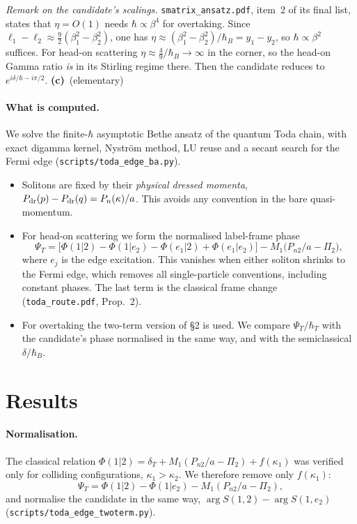 \documentclass[11pt,a4paper]{article}
\newcommand{\Lc}{\textsf{\textbf{(c)}}}\newcommand{\Ld}{\textsf{\textbf{(d)}}}
\newcommand{\script}[1]{\texttt{scripts/#1}}
\begin{document}
\emph{Remark on the candidate's scalings.} \texttt{smatrix\_ansatz.pdf}, item~2 of its final list, states that $\eta=O(1)$ needs $\hbar\propto\beta^4$ for overtaking. Since $\ell_1-\ell_2\approx\tfrac92(\beta_1^2-\beta_2^2)$, one has $\eta\approx(\beta_1^2-\beta_2^2)/\hbar_B=y_1-y_2$, so $\hbar\propto\beta^2$ suffices. For head-on scattering $\eta\approx\tfrac49/\hbar_B\to\infty$ in the corner, so the head-on Gamma ratio \emph{is} in its Stirling regime there. Then the candidate reduces to $e^{i\delta/\hbar-i\pi/2}$. \Lc\ (elementary)

\paragraph{What is computed.} We solve the finite-$\hbar$ asymptotic Bethe ansatz of the quantum Toda chain, with exact digamma kernel, Nyström method, LU reuse and a secant search for the Fermi edge (\script{toda\_edge\_ba.py}).
\begin{itemize}
\item Solitons are fixed by their \emph{physical dressed momenta}, $P_{\rm dr}(p)-P_{\rm dr}(q)=P_n(\kappa)/a$. This avoids any convention in the bare quasi-momentum.
\item For head-on scattering we form the normalised label-frame phase
\[
\Psi_T=\big[\Phi(1|2)-\Phi(1|e_2)-\Phi(e_1|2)+\Phi(e_1|e_2)\big]-M_1\big(P_{n2}/a-\Pi_2\big) ,
\]
where $e_j$ is the edge excitation. This vanishes when either soliton shrinks to the Fermi edge, which removes all single-particle conventions, including constant phases. The last term is the classical frame change (\texttt{toda\_route.pdf}, Prop.~2).
\item For overtaking the two-term version of §2 is used. We compare $\Psi_T/\hbar_T$ with the candidate's phase normalised in the same way, and with the semiclassical $\delta/\hbar_B$.
\end{itemize}

\section{Results}

\paragraph{Normalisation.} The classical relation $\Phi(1|2)=\delta_T+M_1(P_{n2}/a-\Pi_2)+f(\kappa_1)$ was verified only for colliding configurations, $\kappa_1>\kappa_2$. We therefore remove only $f(\kappa_1)$:
\[
\Psi_T=\Phi(1|2)-\Phi(1|e_2)-M_1(P_{n2}/a-\Pi_2),
\]
and normalise the candidate in the same way, $\arg S(1,2)-\arg S(1,e_2)$ (\script{toda\_edge\_twoterm.py}).
\end{document}
